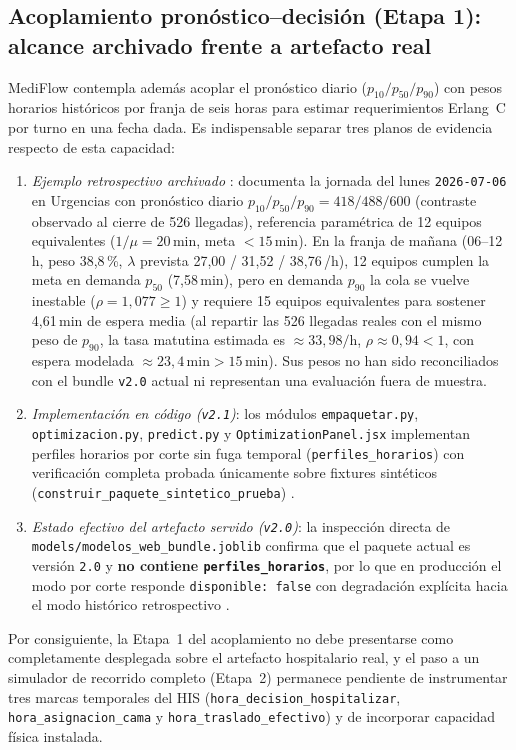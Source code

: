 \subsection{Acoplamiento pronóstico--decisión (Etapa 1): alcance archivado frente a artefacto real}

MediFlow contempla además acoplar el pronóstico diario ($p_{10}/p_{50}/p_{90}$) con pesos horarios históricos por franja de seis horas para estimar requerimientos Erlang~C por turno en una fecha dada. Es indispensable separar tres planos de evidencia respecto de esta capacidad:

\begin{enumerate}[leftmargin=*,nosep]
\item \textit{Ejemplo retrospectivo archivado} \parencite{mediflow2026optimizacion}: documenta la jornada del lunes \texttt{2026-07-06} en Urgencias con pronóstico diario $p_{10}/p_{50}/p_{90} = 418 / 488 / 600$ (contraste observado al cierre de 526 llegadas), referencia paramétrica de 12 equipos equivalentes ($1/\mu = 20\,\text{min}$, meta $<15\,\text{min}$). En la franja de mañana (06--12\,h, peso 38,8\,\%, $\lambda$ prevista 27,00 / 31,52 / 38,76\,/h), 12 equipos cumplen la meta en demanda $p_{50}$ (7,58\,min), pero en demanda $p_{90}$ la cola se vuelve inestable ($\rho = 1{,}077 \ge 1$) y requiere 15 equipos equivalentes para sostener 4,61\,min de espera media (al repartir las 526 llegadas reales con el mismo peso de $p_{90}$, la tasa matutina estimada es $\approx 33{,}98/\text{h}$, $\rho \approx 0{,}94 < 1$, con espera modelada $\approx 23{,}4\,\text{min} > 15\,\text{min}$). Sus pesos no han sido reconciliados con el bundle \texttt{v2.0} actual ni representan una evaluación fuera de muestra.
\item \textit{Implementación en código (\texttt{v2.1})}: los módulos \texttt{empaquetar.py}, \texttt{optimizacion.py}, \texttt{predict.py} y \texttt{OptimizationPanel.jsx} implementan perfiles horarios por corte sin fuga temporal (\texttt{perfiles\_horarios}) con verificación completa probada únicamente sobre fixtures sintéticos (\texttt{construir\_paquete\_sintetico\_prueba}) \parencite{mediflow2026informe,mediflow2026auditoria}.
\item \textit{Estado efectivo del artefacto servido (\texttt{v2.0})}: la inspección directa de \texttt{models/\allowbreak modelos\_web\_bundle.joblib} confirma que el paquete actual es versión \texttt{2.0} y \textbf{no contiene \texttt{perfiles\_horarios}}, por lo que en producción el modo por corte responde \texttt{disponible: false} con degradación explícita hacia el modo histórico retrospectivo \parencite{mediflow2026bundle,mediflow2026auditoria}.
\end{enumerate}

Por consiguiente, la Etapa~1 del acoplamiento no debe presentarse como completamente desplegada sobre el artefacto hospitalario real, y el paso a un simulador de recorrido completo (Etapa~2) permanece pendiente de instrumentar tres marcas temporales del HIS (\texttt{hora\_decision\_hospitalizar}, \texttt{hora\_asignacion\_cama} y \texttt{hora\_traslado\_efectivo}) y de incorporar capacidad física instalada.

